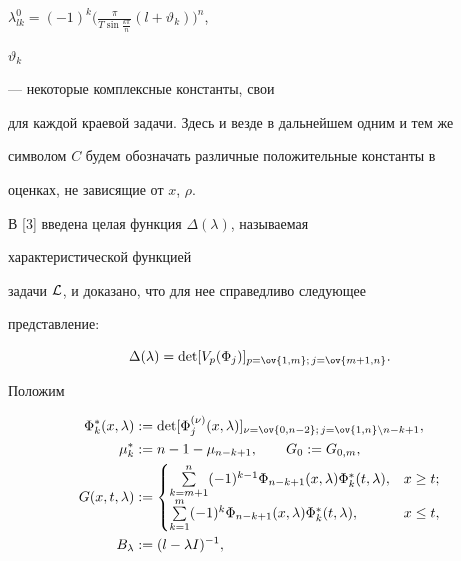 $\lambda^0_{lk}=


(-1)^k\bigl(\frac{\pi}{T\sin\tfrac{k\pi}{n}}(l+\vartheta_k)\bigr)^n$,


$\vartheta_k$


--- некоторые комплексные константы, свои


для каждой краевой задачи. Здесь и везде в дальнейшем одним и тем же


символом $C$ будем обозначать различные положительные константы в


оценках, не зависящие от $x$, $\rho$.





В [3] введена целая функция $\Delta(\lambda)$, называемая


характеристической функцией


задачи $\cal L$, и доказано, что для нее справедливо следующее


представление:


$$


\Delta(\lambda)=


\det[V_p(\Phi_j)]_{p=\ov{1,m};\,j=\ov{m+1,n}}.


$$





Положим


\begin{align*}


\Phi^*_k(x,\lambda)&:=\det[\Phi^{(\nu)}_j(x,\lambda)]_{\nu=


\ov{0,n-2};\,j=\ov{1,n}\setminus n-k+1},\\


\mu^*_k&:=n-1-\mu_{n-k+1},\qquad G_0:=G_{0,m},\\


G(x,t,\lambda)&:=


\begin{cases}


\suml^n_{k=m+1}(-1)^{k-1}\Phi_{n-k+1}(x,\lambda)


\Phi^*_k(t,\lambda),& x\ge t;\\


\suml^m_{k=1}(-1)^k\Phi_{n-k+1}(x,\lambda)\Phi^*_k(t,\lambda),


& x\le t,


\end{cases}


\\


B_\lambda &:=(l-\lambda I)^{-1},


\end{align*}


